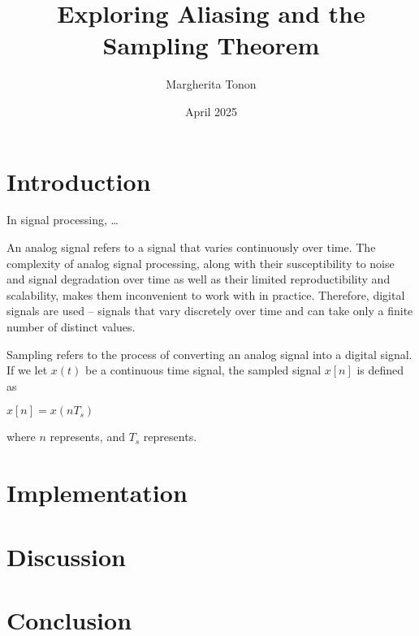 \documentclass{article}
\title{Exploring Aliasing and the Sampling Theorem} %
\author{Margherita Tonon}
\date{April 2025}
\begin{document}
\maketitle

\section{Introduction}
In signal processing, \dots %

An analog signal refers to a signal that varies continuously over time. The complexity of analog signal processing, along with their susceptibility to noise and signal degradation over time as well as their limited reproductibility and scalability, makes them inconvenient to work with in practice. 
Therefore, digital signals are used -- signals that vary discretely over time and can take only a finite number of distinct values.

Sampling refers to the process of converting an analog signal into a digital signal. If we let $x(t)$ be a continuous time signal, the sampled signal $x[n]$ is defined as
\begin{center}
    \begin{math}
        x[n] = x(nT_s)
    \end{math}  
\end{center}
where $n$ represents, and $T_s$ represents.


\section{Implementation}


\section{Discussion}

\section{Conclusion}
\end{document}
